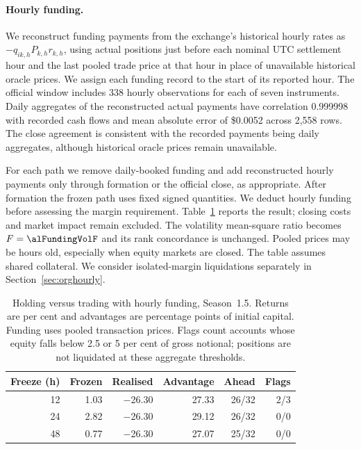 \paragraph{Hourly funding.}
We reconstruct funding payments from the exchange's historical hourly rates as
$-q_{ik,h}P_{k,h}r_{k,h}$, using actual positions just before each nominal
UTC settlement hour and the last pooled trade price at that hour in place of
unavailable historical oracle prices. We assign each funding record to
the start of its reported hour. The official window includes 338 hourly observations
for each of seven instruments. Daily aggregates of the reconstructed actual
payments have correlation 0.999998 with recorded cash flows and mean absolute
error of \$0.0052 across 2,558 rows. The close agreement is consistent with the recorded payments being
daily aggregates, although historical oracle prices remain unavailable.

For each path we remove daily-booked funding and add reconstructed hourly
payments only through formation or the official close, as appropriate.
After formation the frozen path uses fixed signed quantities. We deduct hourly funding before assessing the margin requirement. Table~\ref{tab:hourfund}
reports the result; closing costs and market impact remain excluded.
The volatility mean-square ratio becomes $F=\alFundingVolF$ and its rank
concordance is unchanged. Pooled prices may be hours old, especially when
equity markets are closed. The table assumes shared collateral. We consider isolated-margin
liquidations separately in Section~\ref{sec:orghourly}.

\begin{table}[ht]
\centering\small
\caption{Holding versus trading with hourly funding, Season~1.5. Returns are
per cent and advantages are percentage points of initial capital. Funding
uses pooled transaction prices. Flags count accounts whose equity falls
below 2.5 or 5 per cent of gross notional; positions are not liquidated
at these aggregate thresholds.}
\label{tab:hourfund}
\begin{tabular}{rrrrrr}
\toprule
Freeze (h) & Frozen & Realised & Advantage & Ahead & Flags \\
\midrule
12 & 1.03 & \ensuremath{-}26.30 & 27.33 & 26/32 & 2/3 \\
24 & 2.82 & \ensuremath{-}26.30 & 29.12 & 26/32 & 0/0 \\
48 & 0.77 & \ensuremath{-}26.30 & 27.07 & 25/32 & 0/0 \\
\bottomrule
\end{tabular}
\end{table}
